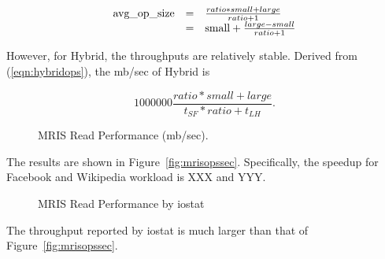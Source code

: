 \begin{equation}
\label{eqn:opsize}
\begin{array}{r@{\quad=\quad}l}
  \mbox{avg\_op\_size} & \frac{ratio * small + large}{ratio + 1} \\
   & \mbox{small} + \frac{large - small}{ratio + 1} 
\end{array}
\end{equation}

However, for Hybrid, the throughputs are relatively stable. Derived
from (\ref{eqn:hybridops}), the mb/sec of Hybrid is 

\begin{equation}
\label{eqn:hybridthput}
    1000000 \frac{ratio * small + large}{t_{SF} * ratio + t_{LH}} .
\end{equation}

\begin{figure}[t]
\begin{centering}
\caption{MRIS Read Performance (mb/sec).}
\label{fig:mrismbsec}
\end{centering}
\end{figure}



The results are shown in Figure~\ref{fig:mrisopssec}.  Specifically,
the speedup for Facebook and Wikipedia workload is XXX and YYY. 

\begin{figure}[t]
\begin{centering}
\caption{MRIS Read Performance by iostat}
\label{fig:mrisiostat}
\end{centering}
\end{figure}

The throughput reported by iostat is much larger than that of
Figure~\ref{fig:mrisopssec}.

